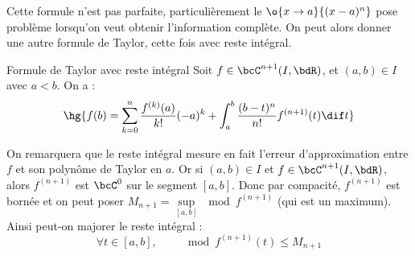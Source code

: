 \documentclass[a4paper,french,bookmarks]{article}
\begin{document}
    Cette formule n'est pas parfaite, particulièrement le $\o{x \to a}{(x-a)^n}$ pose problème lorsqu'on veut obtenir l'information complète. On peut alors donner une autre formule de Taylor, cette fois avec reste intégral.
    
    \begin{theorem}{Formule de Taylor avec reste intégral}{}
        Soit $f \in \bcC^{n+1}(I, \bdR)$, et $(a, b) \in I$ avec $a < b$. On a :
        \[ \hg{f(b) = \sum_{k=0}^n \dfrac{f^{(k)}(a)}{k!}(-a)^k + \int_a^b \dfrac{(b-t)^n}{n!}f^{(n+1)}(t)\dif t}\]
    \end{theorem}
    
    
    On remarquera que le reste intégral mesure en fait l'erreur d'approximation entre $f$ et son polynôme de Taylor en $a$. Or si $(a, b) \in I$ et $f \in \bcC^{n+1}(I, \bdR)$, alors $f^{(n+1)}$ est $\bcC^0$ sur le segment $[a, b]$. Donc par compacité, $f^{(n+1)}$ est bornée et on peut poser $M_{n+1} = \sup\limits_{[a, b]} \mod{f^{(n+1)}}$ (qui est un maximum). Ainsi peut-on majorer le reste intégral :
    \[ \forall t \in [a, b],\qquad \mod{f^{(n+1)}(t)} \leq M_{n+1}\]
    
\end{document}
